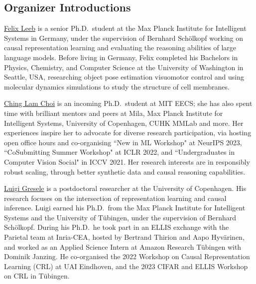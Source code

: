 \documentclass{article}
\begin{document}

\subsection{Organizer Introductions}

\href{https://felixludos.com/}{Felix Leeb} 
is a senior Ph.D.\ student at the Max Planck Institute for Intelligent Systems in Germany, under the supervision of Bernhard Schölkopf working on causal representation learning and evaluating the reasoning abilities of large language models. Before living in Germany, Felix completed his Bachelors in Physics, Chemistry, and Computer Science at the University of Washington in Seattle, USA, researching object pose estimation visuomotor control and using molecular dynamics simulations to study the structure of cell membranes.

\href{https://chinglamchoi.github.io/cchoi/}{Ching Lam Choi} is an incoming Ph.D.\ student at MIT EECS; she has also spent time with brilliant mentors and peers at Mila, Max Planck Institute for Intelligent Systems, University of Copenhagen, CUHK MMLab and more. Her experiences inspire her to advocate for diverse research participation, via hosting open office hours and co-organising ``New in ML Workshop" at NeurIPS 2023, ``CoSubmitting Summer Workshop" at ICLR 2022, and ``Undergraduates in Computer Vision Social" in ICCV 2021. Her research interests are in responsibly robust scaling, through better synthetic data and causal reasoning capabilities.

\href{https://lgresele.github.io/}{Luigi Gresele}  is a postdoctoral researcher at the University of Copenhagen. His research focuses on the intersection of representation learning and causal inference. Luigi earned his Ph.D.\ from the Max Planck Institute for Intelligent Systems and the University of Tübingen, under the supervision of Bernhard Schölkopf. During his Ph.D.\, he took part in an ELLIS exchange with the Parietal team at Inria-CEA, hosted by Bertrand Thirion and Aapo Hyvärinen, and worked as an Applied Science Intern at Amazon Research Tübingen with Dominik Janzing. He co-organised the 2022 Workshop on Causal Representation Learning (CRL) at UAI Eindhoven, and the 2023 CIFAR and ELLIS Workshop on CRL in T\"ubingen.
\end{document}
